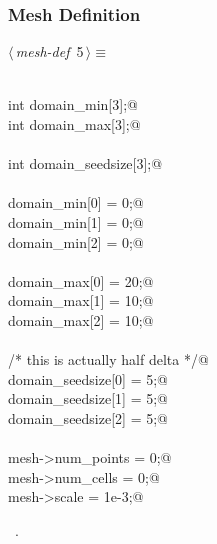 \documentclass[a4paper,11pt]{article}
\begin{document}
\begin{flushleft}
\begin{minipage}{\linewidth}
\begin{list}{}{\setlength{\itemsep}{-\parsep}\setlength{\itemindent}{-\leftmargin}}
\item{}
\end{list}
\end{minipage}\vspace{4ex}
\end{flushleft}
\subsubsection{Mesh Definition}
\begin{flushleft} \small
\begin{minipage}{\linewidth}\label{scrap3}\raggedright\small
{} $\langle\,${\itshape mesh-def}\nobreak\ {\footnotesize {5}}$\,\rangle\equiv$
\vspace{-1ex}
\begin{list}{}{} \item
\mbox{}\verb@@\\
\mbox{}\verb@    int domain_min[3];@\\
\mbox{}\verb@    int domain_max[3];@\\
\mbox{}\verb@@\\
\mbox{}\verb@    int domain_seedsize[3];@\\
\mbox{}\verb@@\\
\mbox{}\verb@    domain_min[0] = 0;@\\
\mbox{}\verb@    domain_min[1] = 0;@\\
\mbox{}\verb@    domain_min[2] = 0;@\\
\mbox{}\verb@@\\
\mbox{}\verb@    domain_max[0] = 20;@\\
\mbox{}\verb@    domain_max[1] = 10;@\\
\mbox{}\verb@    domain_max[2] = 10;@\\
\mbox{}\verb@@\\
\mbox{}\verb@    /* this is actually half delta */@\\
\mbox{}\verb@    domain_seedsize[0] = 5;@\\
\mbox{}\verb@    domain_seedsize[1] = 5;@\\
\mbox{}\verb@    domain_seedsize[2] = 5;@\\
\mbox{}\verb@@\\
\mbox{}\verb@    mesh->num_points = 0;@\\
\mbox{}\verb@    mesh->num_cells = 0;@\\
\mbox{}\verb@    mesh->scale = 1e-3;@\\
\mbox{}\verb@@{\NWsep}
\end{list}
\vspace{-1.5ex}
\footnotesize
\begin{list}{}{\setlength{\itemsep}{-\parsep}\setlength{\itemindent}{-\leftmargin}}
\item \NWtxtMacroRefIn\ .

\item{}
\end{list}
\end{minipage}\vspace{4ex}
\end{flushleft}
\end{document}
